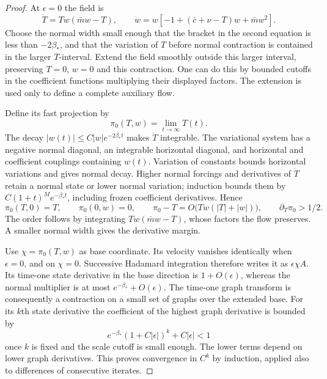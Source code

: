 \begin{proof}
At $\epsilon=0$ the field is
\[
 \dot T=Tw(\bar m w-T),\qquad
 \dot w=w[-1+(\bar c+\nu-T)w+\bar m w^2].
\]
Choose the normal width small enough that the bracket in the second
equation is less than $-2\beta_*$, and that the variation of $T$ before
normal contraction is contained in the larger $T$-interval. Extend the
field smoothly outside this larger interval, preserving $T=0$, $w=0$
and this contraction. One can do this by bounded cutoffs in the
coefficient functions multiplying their displayed factors. The extension
is used only to define a complete auxiliary flow.

Define its fast projection by
\[
 \pi_0(T,w)=\lim_{t\to\infty}T(t).
\]
The decay $|w(t)|\le C|w|e^{-2\beta_*t}$ makes $\dot T$ integrable.
The variational system has a negative normal diagonal, an integrable
horizontal diagonal, and horizontal and coefficient couplings containing
$w(t)$. Variation of constants bounds horizontal variations and gives
normal decay. Higher normal forcings and derivatives of $\dot T$ retain
a normal state or lower normal variation; induction bounds them by
$C(1+t)^Me^{-\beta_*t}$, including frozen coefficient derivatives. Hence
\begin{equation}\label{rw:transitions:zero-phase}
 \pi_0(T,0)=T,\qquad \pi_0(0,w)=0,\qquad
 \pi_0-T=O\bigl(Tw(|T|+|w|)\bigr),\qquad
 \partial_T\pi_0>1/2.
\end{equation}
The order follows by integrating $Tw(\bar m w-T)$, whose factors the
flow preserves. A smaller normal width gives the derivative margin.

Use $\chi=\pi_0(T,w)$ as base coordinate. Its velocity vanishes
identically when $\epsilon=0$, and on $\chi=0$. Successive Hadamard
integration therefore writes it as $\epsilon\chi A$. Its time-one
state derivative in the base direction is $1+O(\epsilon)$, whereas
the normal multiplier is at most $e^{-\beta_*}+O(\epsilon)$.
The time-one graph transform is consequently a contraction on a small
set of graphs over the extended base. For its $k$th state derivative
the coefficient of the highest graph derivative is bounded by
\[
 e^{-\beta_*}(1+C|\epsilon|)^k+C|\epsilon|<1
\]
once $k$ is fixed and the scale cutoff is small enough. The lower
terms depend on lower graph derivatives. This proves convergence in
$C^k$ by induction, applied also to differences of consecutive iterates.


\end{proof}
